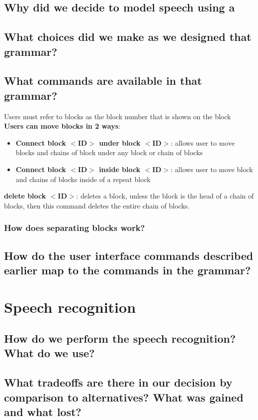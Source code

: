 \documentclass[]{article}
\begin{document}
\subsection{Why did we decide to model speech using a} %

\subsection{What choices did we make as we designed that grammar?}

\subsection{What commands are available in that grammar?}
Users must refer to blocks as the block number that is shown on the block\\
\textbf{Users can move blocks in 2 ways}:
\begin{itemize}
\item \textbf{Connect block $<$ID$>$ under block $<$ID$>$}: allows user to move blocks and chains of block under any block or chain of blocks
\item \textbf{Connect block $<$ID$>$ inside block $<$ID$>$}: allows user to move block and chains of blocks inside of a repeat block
\end{itemize}
\textbf{delete block $<$ID$>$}: deletes a block,  unless the block is the head of a chain of blocks, then this command deletes the entire chain of blocks.
\subsubsection{How does separating blocks work?}
\subsection{How do the user interface commands described earlier map to the commands in the grammar?  }

\section{Speech recognition}

\subsection{How do we perform the speech recognition? What do we use?}

\subsection{What tradeoffs are there in our decision by comparison to alternatives? What was gained and what lost?}
\end{document}
